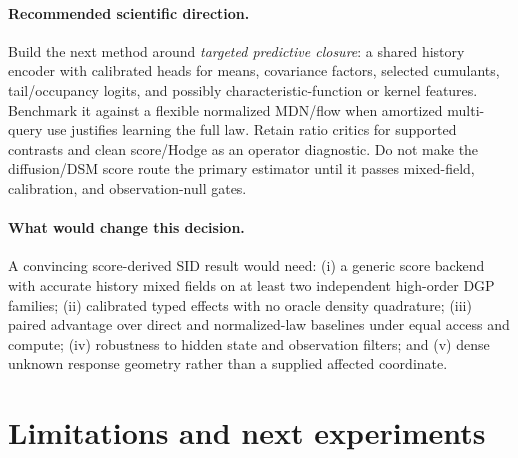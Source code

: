 \documentclass[11pt]{article}
\begin{document}

\paragraph{Recommended scientific direction.}
Build the next method around \emph{targeted predictive closure}: a shared history
encoder with calibrated heads for means, covariance factors, selected cumulants,
tail/occupancy logits, and possibly characteristic-function or kernel features.
Benchmark it against a flexible normalized MDN/flow when amortized multi-query use
justifies learning the full law.  Retain ratio critics for supported contrasts and
clean score/Hodge as an operator diagnostic.  Do not make the diffusion/DSM score
route the primary estimator until it passes mixed-field, calibration, and
observation-null gates.

\paragraph{What would change this decision.}
A convincing score-derived SID result would need: (i) a generic score backend with
accurate history mixed fields on at least two independent high-order DGP families;
(ii) calibrated typed effects with no oracle density quadrature; (iii) paired
advantage over direct and normalized-law baselines under equal access and compute;
(iv) robustness to hidden state and observation filters; and (v) dense unknown
response geometry rather than a supplied affected coordinate.

\section{Limitations and next experiments}
\end{document}
